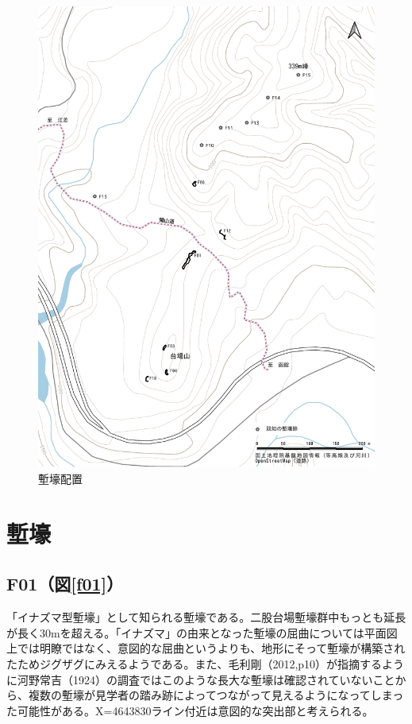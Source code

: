 \documentclass[14Q]{jsarticle}
\begin{document}
\begin{figure}[h]
\centering
\includegraphics[width=160truemm]{fig/haitizu_tate.pdf}
\caption{塹壕配置}
\label{haiti_tate}
\end{figure}

\section{塹壕}
\subsection{F01（図\ref{f01}）}
「イナズマ型塹壕」として知られる塹壕である。二股台場塹壕群中もっとも延長が長く30mを超える。「イナズマ」の由来となった塹壕の屈曲については平面図上では明瞭ではなく、意図的な屈曲というよりも、地形にそって塹壕が構築されたためジグザグにみえるようである。また、毛利剛（2012,p10）が指摘するように河野常吉（1924）の調査ではこのような長大な塹壕は確認されていないことから、複数の塹壕が見学者の踏み跡によってつながって見えるようになってしまった可能性がある。X=4643830ライン付近は意図的な突出部と考えられる。
\end{document}
